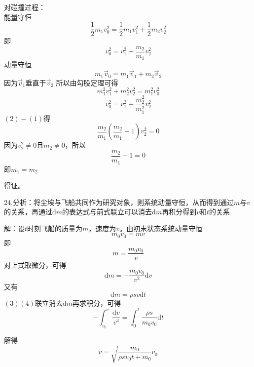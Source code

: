 \documentclass[blue, pad]{./templete/qyxfnote}
\newcommand{\di}[1]{\mathrm{d}#1}
\begin{document}
			对碰撞过程：\\能量守恒
			\begin{equation*}
			\frac{1}{2}m_1v_0^2=\frac{1}{2}m_1v_1^2+\frac{1}{2}m_2v_2^2
			\end{equation*}
			即
			\begin{equation}
			v_0^2=v_1^2+\frac{m_2}{m_1}v_2^2
			\end{equation}
			动量守恒
			\begin{equation*}
			m_1\vec{v}_0=m_1\vec{v}_1+m_2\vec{v}_2
			\end{equation*}
			因为$\vec{v}_1$垂直于$\vec{v}_2$
			所以由勾股定理可得
			\begin{equation*}
			m_1^2 v_1^2 + m_2^2 v_2^2 = m_1^2 v_0^2
			\end{equation*}
			\begin{equation}
			v_0^2=v_1^2+\frac{m_2^2}{m_1^2}v_2^2
			\end{equation}
			$(2)-(1)$得
			\begin{equation*}
			\frac{m_2}{m_1}(\frac{m_2}{m_1}-1)v_2^2=0
			\end{equation*}
			因为$v_2^2 \ne 0$且$m_2 \ne 0$，所以
			\begin{equation*}
			\frac{m_2}{m_1}-1=0
			\end{equation*}
			即$m_1=m_2$
			
			得证。
			
			24.分析：将尘埃与飞船共同作为研究对象，则系统动量守恒，从而得到通过$m$与$v$的关系，再通过$\di m$的表达式与前式联立可以消去$\di m$再积分得到$v$和$t$的关系
			
			解：设$t$时刻飞船的质量为$m$，速度为$v$。由初末状态系统动量守恒
			\begin{equation*}
			m_0 v_0=mv
			\end{equation*}
			即
			\begin{equation*}
			m=\frac{m_0 v_0}{v}
			\end{equation*}
			对上式取微分，可得
			\begin{equation}
			\di m=- \frac{m_0 v_0}{v^2} \di v
			\end{equation}
			又有
			\begin{equation}
			\di m=\rho sv\di t
			\end{equation}
			$(3)(4)$联立消去$\di m$再求积分，可得
			\begin{equation*}
			-\int_{v_0}^v \frac{\di v}{v^3}=\int_0^t \frac{\rho s}{m_0 v_0} \di t
			\end{equation*}
			
			解得
			\begin{equation*}
			v=\sqrt{\frac{m_0}{\rho sv_0 t+m_0}v_0}
			\end{equation*}
\end{document}
